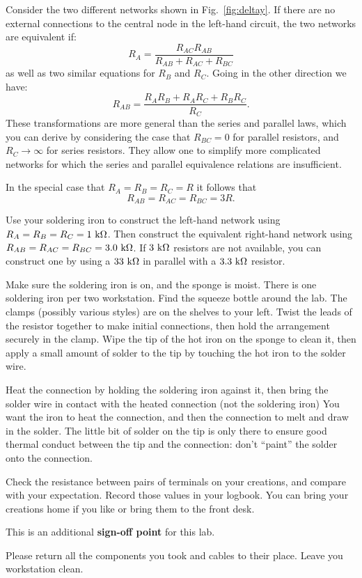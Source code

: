 Consider the two different networks shown in Fig.~\ref{fig:deltay}.
If there are no external connections to the central node in the
left-hand circuit, the two networks are equivalent if:
\begin{displaymath}
R_{A} = \frac{R_{AC} R_{AB}}{R_{AB} + R_{AC} + R_{BC}}
\end{displaymath}
as well as two similar equations for $R_{B}$ and $R_{C}$.  Going in the other direction we have:
\begin{displaymath}
R_{AB} = \frac{R_{A}R_{B} + R_{A}R_{C} + R_{B}R_{C}}{R_{C}}.
\end{displaymath}
These transformations are more general than the series and parallel
laws, which you can derive by considering the case that $R_{BC}=0$ for
parallel resistors, and $R_{C} \to \infty$ for series resistors.  They
allow one to simplify more complicated networks for which the series and
parallel equivalence relations are insufficient.

In the special case that $R_{A} = R_{B} = R_{C} = R$ it follows that 
\begin{displaymath}
R_{AB} = R_{AC} = R_{BC} = 3 R.
\end{displaymath}

Use your soldering iron to construct the left-hand network using
$R_{A} = R_{B} = R_{C} = 1~\rm k\Omega$.  Then construct the
equivalent right-hand network using $R_{AB} = R_{AC} = R_{BC} =
3.0~\rm k\Omega$.  If $3~\rm k\Omega$ resistors are not available, you
can construct one by using a $33~\rm k\Omega$ in parallel with a
$3.3~\rm k\Omega$ resistor.

Make sure the soldering iron is on, and the sponge is moist.  There is
one soldering iron per two workstation. Find the squeeze bottle around
the lab. The clamps (possibly various styles) are on the shelves to
your left. Twist the leads of the resistor together to make initial
connections, then hold the arrangement securely in the clamp.  Wipe
the tip of the hot iron on the sponge to clean it, then apply a small
amount of solder to the tip by touching the hot iron to the solder
wire.

Heat the connection by holding the soldering iron against it, then
bring the solder wire in contact with the heated connection (not the
soldering iron) You want the iron to heat the connection, and then the
connection to melt and draw in the solder.  The little bit of solder
on the tip is only there to ensure good thermal conduct between the
tip and the connection: don't ``paint'' the solder onto the
connection.

\begin{measurement} 
Check the resistance between pairs of terminals on your creations, and
compare with your expectation. Record those values in your logbook. You can bring your creations home if
you like or bring them to the front desk. 
\end{measurement}

This is an additional \textbf{sign-off point} for this lab. 

\noindent
Please return all the components you took and cables to their place. Leave you workstation clean. 

